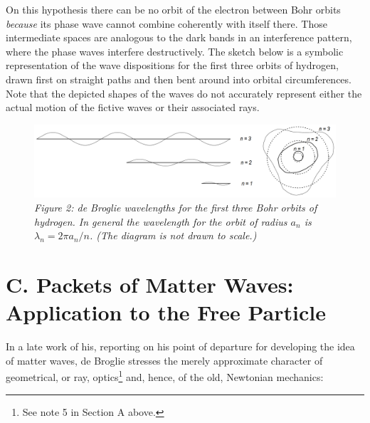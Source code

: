 On this hypothesis there can be no orbit of the electron between Bohr
orbits \emph{because} its phase wave cannot combine coherently with
itself there. Those intermediate spaces are analogous to the dark bands
in an interference pattern, where the phase waves interfere
destructively. The sketch below is a symbolic representation of the wave
dispositions for the first three orbits of hydrogen, drawn first on
straight paths and then bent around into orbital circumferences. Note
that the depicted shapes of the waves do not accurately represent either
the actual motion of the fictive waves or their associated rays.

\begin{figure}[h] %
  \begin{center}
    \includegraphics[width=\textwidth]{images/08_debroglie/standing-waves.png}
  \end{center}
  \caption*{\emph{Figure 2: de Broglie wavelengths for the first three Bohr orbits of
     hydrogen. In general the wavelength for the orbit of radius $a_n$ is
     $\lambda_n = 2\pi a_n/n$. (The diagram is not drawn to scale.)}}
\end{figure}



\section*{C. Packets of Matter Waves: Application to the Free Particle }\label{SecC}

In a late work of his, reporting on his point of departure for
developing the idea of matter waves, de Broglie stresses the merely
approximate character of geometrical, or ray, optics\footnote{See note 5
  in Section A above.} and, hence, of the old, Newtonian mechanics:


